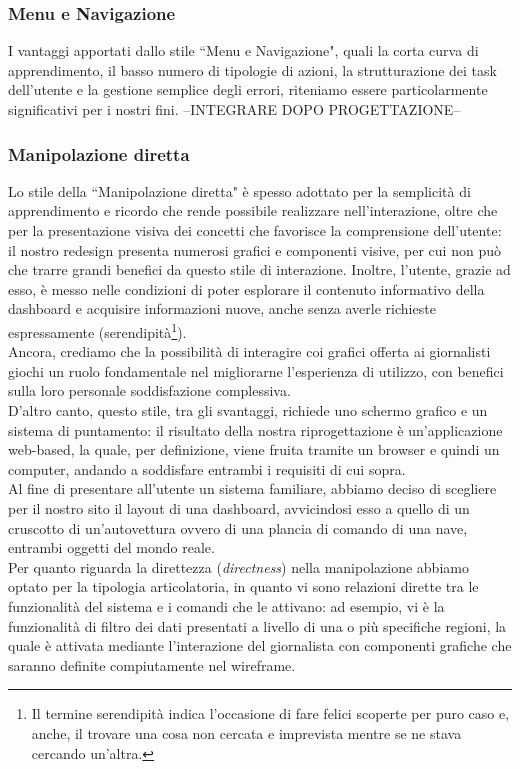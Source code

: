\subsubsection{Menu e Navigazione}
I vantaggi apportati dallo stile ``Menu e Navigazione", quali la corta curva di apprendimento, il basso numero di tipologie di azioni, la strutturazione dei task dell'utente e la gestione semplice degli errori, riteniamo essere particolarmente significativi per i nostri fini.
--INTEGRARE DOPO PROGETTAZIONE--

\subsubsection{Manipolazione diretta}
Lo stile della ``Manipolazione diretta" è spesso adottato per la semplicità di apprendimento e ricordo che rende possibile realizzare nell'interazione, oltre che per la presentazione visiva dei concetti che favorisce la comprensione dell'utente: il nostro redesign presenta numerosi grafici e componenti visive, per cui non può che trarre grandi benefici da questo stile di interazione. Inoltre, l'utente, grazie ad esso, è messo nelle condizioni di poter esplorare il contenuto informativo della dashboard e acquisire informazioni nuove, anche senza averle richieste espressamente (serendipità\footnote{Il termine serendipità indica l'occasione di fare felici scoperte per puro caso e, anche, il trovare una cosa non cercata e imprevista mentre se ne stava cercando un'altra.}).\\
Ancora, crediamo che la possibilità di interagire coi grafici offerta ai giornalisti giochi un ruolo fondamentale nel migliorarne l'esperienza di utilizzo, con benefici sulla loro personale soddisfazione complessiva.\\
D'altro canto, questo stile, tra gli svantaggi, richiede uno schermo grafico e un sistema di puntamento: il risultato della nostra riprogettazione è un'applicazione web-based, la quale, per definizione, viene fruita tramite un browser e quindi un computer, andando a soddisfare entrambi i requisiti di cui sopra.\\
Al fine di presentare all'utente un sistema familiare, abbiamo deciso di scegliere per il nostro sito il layout di una dashboard, avvicindosi esso a quello di un cruscotto di un'autovettura ovvero di una plancia di comando di una nave, entrambi oggetti del mondo reale.\\
Per quanto riguarda la direttezza (\textit{directness}) nella manipolazione abbiamo optato per la tipologia articolatoria, in quanto vi sono relazioni dirette tra le funzionalità del sistema e i comandi che le attivano: ad esempio, vi è la funzionalità di filtro dei dati presentati a livello di una o più specifiche regioni, la quale è attivata mediante l'interazione del giornalista con componenti grafiche che saranno definite compiutamente nel wireframe.

